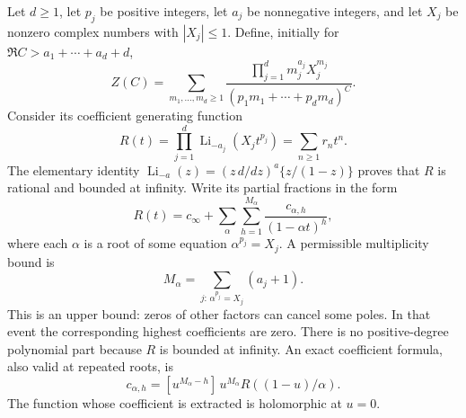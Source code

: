 Let $d\geq1$, let $p_j$ be positive integers, let $a_j$ be nonnegative
integers, and let $X_j$ be nonzero complex numbers with $|X_j|\leq1$.
Define, initially for $\Re C>a_1+\cdots+a_d+d$,
\begin{equation}\label{sp:weighteddef}
 Z(C)=\sum_{m_1,\ldots,m_d\geq1}
  \frac{\prod_{j=1}^d m_j^{a_j}X_j^{m_j}}
       {(p_1m_1+\cdots+p_dm_d)^C}.
\end{equation}
Consider its coefficient generating function
\begin{equation}\label{sp:rationalR}
 R(t)=\prod_{j=1}^d\operatorname{Li}_{-a_j}(X_jt^{p_j})
      =\sum_{n\geq1}r_nt^n.
\end{equation}
The elementary identity
$\operatorname{Li}_{-a}(z)=(z\,d/dz)^a\{z/(1-z)\}$ proves that
$R$ is rational and bounded at infinity.  Write its partial fractions
in the form
\begin{equation}\label{sp:partialR}
 R(t)=c_\infty+
       \sum_{\alpha}\sum_{h=1}^{M_\alpha}
           \frac{c_{\alpha,h}}{(1-\alpha t)^h},
\end{equation}
where each $\alpha$ is a root of some equation
$\alpha^{p_j}=X_j$.  A permissible multiplicity bound is
\[
 M_\alpha=\sum_{j:\,\alpha^{p_j}=X_j}(a_j+1).
\]
This is an upper bound: zeros of other factors can cancel some poles.
In that event the corresponding highest coefficients are zero.
There is no positive-degree polynomial part because $R$ is bounded
at infinity.  An exact coefficient formula, also valid at repeated
roots, is
\begin{equation}\label{sp:cformula}
 c_{\alpha,h}
   =[u^{M_\alpha-h}]\,
       u^{M_\alpha}R((1-u)/\alpha).
\end{equation}
The function whose coefficient is extracted is holomorphic at $u=0$.

